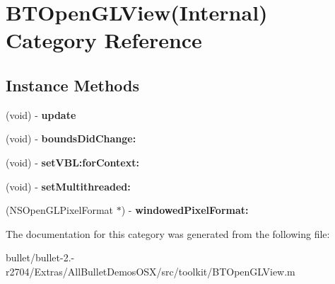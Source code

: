 \hypertarget{category_b_t_open_g_l_view_07_internal_08}{\section{B\+T\+Open\+G\+L\+View(Internal) Category Reference}
\label{category_b_t_open_g_l_view_07_internal_08}
}
\subsection*{Instance Methods}
\begin{DoxyCompactItemize}
\item 
\hypertarget{category_b_t_open_g_l_view_07_internal_08_a615b29c04f78d5bb3cf09080ffa76603}{(void) -\/ {\bfseries update}}\label{category_b_t_open_g_l_view_07_internal_08_a615b29c04f78d5bb3cf09080ffa76603}

\item 
\hypertarget{category_b_t_open_g_l_view_07_internal_08_ab1a3fe4ca45286cddb7bd652424062cd}{(void) -\/ {\bfseries bounds\+Did\+Change\+:}}\label{category_b_t_open_g_l_view_07_internal_08_ab1a3fe4ca45286cddb7bd652424062cd}

\item 
\hypertarget{category_b_t_open_g_l_view_07_internal_08_a98edde485690ec4153ce28e82e31b3cc}{(void) -\/ {\bfseries set\+V\+B\+L\+:for\+Context\+:}}\label{category_b_t_open_g_l_view_07_internal_08_a98edde485690ec4153ce28e82e31b3cc}

\item 
\hypertarget{category_b_t_open_g_l_view_07_internal_08_a87b09e9251e422c21cb3efd57e26f486}{(void) -\/ {\bfseries set\+Multithreaded\+:}}\label{category_b_t_open_g_l_view_07_internal_08_a87b09e9251e422c21cb3efd57e26f486}

\item 
\hypertarget{category_b_t_open_g_l_view_07_internal_08_af5b14bd58c725e5a5054532bd18d2440}{(N\+S\+Open\+G\+L\+Pixel\+Format $\ast$) -\/ {\bfseries windowed\+Pixel\+Format\+:}}\label{category_b_t_open_g_l_view_07_internal_08_af5b14bd58c725e5a5054532bd18d2440}

\end{DoxyCompactItemize}


The documentation for this category was generated from the following file\+:\begin{DoxyCompactItemize}
\item 
bullet/bullet-\/2.-\/r2704/\+Extras/\+All\+Bullet\+Demos\+O\+S\+X/src/toolkit/B\+T\+Open\+G\+L\+View.\+m\end{DoxyCompactItemize}
